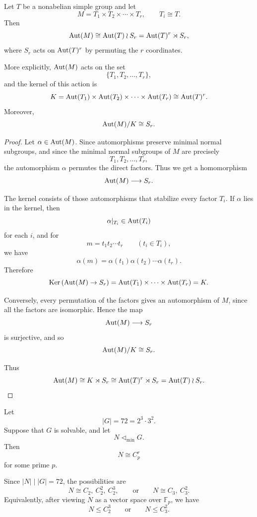 \begin{theorem}[Automorphisms of $T^r$]
Let $T$ be a nonabelian simple group and let
\[
    M=T_1\times T_2\times\cdots\times T_r,
    \qquad
    T_i\cong T.
\]
Then
\[
    \operatorname{Aut}(M)\cong \operatorname{Aut}(T)\wr S_r
    =
    \operatorname{Aut}(T)^r\rtimes S_r,
\]
where $S_r$ acts on $\operatorname{Aut}(T)^r$ by permuting the $r$ coordinates.

More explicitly, $\operatorname{Aut}(M)$ acts on the set
\[
    \{T_1,T_2,\ldots,T_r\},
\]
and the kernel of this action is
\[
    K=\operatorname{Aut}(T_1)\times\operatorname{Aut}(T_2)\times\cdots\times\operatorname{Aut}(T_r)
    \cong \operatorname{Aut}(T)^r.
\]
Moreover,
\[
    \operatorname{Aut}(M)/K\cong S_r.
\]
\end{theorem}

\begin{proof}
Let $\alpha\in\operatorname{Aut}(M)$. Since automorphisms preserve minimal normal subgroups, and since the minimal normal subgroups of $M$ are precisely
\[
    T_1,T_2,\ldots,T_r,
\]
the automorphism $\alpha$ permutes the direct factors. Thus we get a homomorphism
\[
    \operatorname{Aut}(M)\longrightarrow S_r.
\]

The kernel consists of those automorphisms that stabilize every factor $T_i$. If $\alpha$ lies in the kernel, then
\[
    \alpha|_{T_i}\in\operatorname{Aut}(T_i)
\]
for each $i$, and for
\[
    m=t_1t_2\cdots t_r
    \qquad(t_i\in T_i),
\]
we have
\[
    \alpha(m)
    =
    \alpha(t_1)\alpha(t_2)\cdots\alpha(t_r).
\]
Therefore
\[
    \operatorname{Ker}\left(\operatorname{Aut}(M)\to S_r\right)
    =
    \operatorname{Aut}(T_1)\times\cdots\times\operatorname{Aut}(T_r)
    =
    K.
\]

Conversely, every permutation of the factors gives an automorphism of $M$, since all the factors are isomorphic. Hence the map
\[
    \operatorname{Aut}(M)\longrightarrow S_r
\]
is surjective, and so
\[
    \operatorname{Aut}(M)/K\cong S_r.
\]

Thus
\[
    \operatorname{Aut}(M)\cong K\rtimes S_r
    \cong \operatorname{Aut}(T)^r\rtimes S_r
    =
    \operatorname{Aut}(T)\wr S_r.
\]
\end{proof}

\begin{example}
Let
\[
    |G|=72=2^3\cdot 3^2.
\]
Suppose that $G$ is solvable, and let
\[
    N\lhd_{\mathrm{min}}G.
\]
Then
\[
    N\cong C_p^r
\]
for some prime $p$.

Since $|N|\mid |G|=72$, the possibilities are
\[
    N\cong C_2,\ C_2^2,\ C_2^3,
    \qquad\text{or}\qquad
    N\cong C_3,\ C_3^2.
\]
Equivalently, after viewing $N$ as a vector space over $\mathbb F_p$, we have
\[
    N\leq C_2^3
    \qquad\text{or}\qquad
    N\leq C_3^2.
\]
\end{example}

